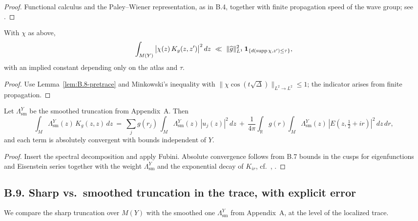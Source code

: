 \begin{proof}
Functional calculus and the Paley–Wiener representation, as in B.4, together
with finite propagation speed of the wave group; see \cite[§5.1]{Sogge}.
\end{proof}

\begin{proposition}\label{prop:B.8-L2pretrace}
With $\chi$ as above,
\[
\int_{M(Y)} \big| \chi(z)\,K_g(z,z')\big|^2\,dz
\ \ll\ \|\widehat g\|_{L^1}^2\, \mathbf 1_{\{d(\operatorname{supp}\chi, z')\le \tau\}},
\]
with an implied constant depending only on the atlas and $\tau$.
\end{proposition}

\begin{proof}
Use Lemma~\ref{lem:B.8-pretrace} and Minkowski’s inequality with
$\|\chi\cos(t\sqrt\Delta)\|_{L^2\to L^2}\le 1$; the indicator arises from finite propagation.
\end{proof}

\begin{theorem}\label{thm:B.8-pretraceY}
Let $\Lambda^Y_{\mathrm{sm}}$ be the smoothed truncation from Appendix~A.
Then
\[
\int_{M} \Lambda^Y_{\mathrm{sm}}(z)\, K_g(z,z)\,dz
\ =\ \sum_j g(r_j)\,\int_{M} \Lambda^Y_{\mathrm{sm}}(z)\,|u_j(z)|^2\,dz
\ +\ \frac{1}{4\pi}\!\int_{\mathbb R} g(r)\!\int_{M} \Lambda^Y_{\mathrm{sm}}(z)\,|E(z,\tfrac12+ir)|^2\,dz\,dr,
\]
and each term is absolutely convergent with bounds independent of $Y$.
\end{theorem}

\begin{proof}
Insert the spectral decomposition and apply Fubini. Absolute convergence follows from B.7 bounds in the cusps for eigenfunctions and Eisenstein series together with the weight $\Lambda^Y_{\mathrm{sm}}$ and the exponential decay of $K_{i r}$, cf.\ \cite[Chap.~3]{Iwaniec2002}, \cite[§7.3]{Borthwick}.
\end{proof}

\subsection*{B.9. Sharp vs.\ smoothed truncation in the trace, with explicit error}

\noindent
We compare the sharp truncation over $M(Y)$ with the smoothed one
$\Lambda^Y_{\mathrm{sm}}$ from Appendix~A, at the level of the localized trace.


